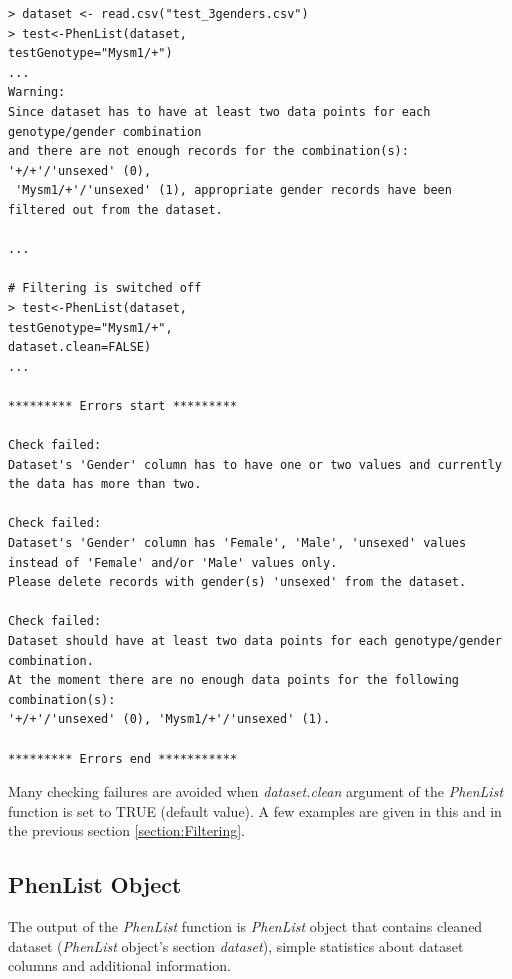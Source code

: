 \documentclass[12pt,a4paper]{article}
\begin{document}
\begingroup
    \fontsize{8pt}{12pt}\selectfont
\begin{verbatim}
> dataset <- read.csv("test_3genders.csv")
> test<-PhenList(dataset,
testGenotype="Mysm1/+")
...
Warning:
Since dataset has to have at least two data points for each genotype/gender combination 
and there are not enough records for the combination(s): '+/+'/'unsexed' (0),
 'Mysm1/+'/'unsexed' (1), appropriate gender records have been filtered out from the dataset.

...

# Filtering is switched off
> test<-PhenList(dataset,
testGenotype="Mysm1/+",
dataset.clean=FALSE)
...

********* Errors start *********

Check failed:
Dataset's 'Gender' column has to have one or two values and currently the data has more than two.

Check failed:
Dataset's 'Gender' column has 'Female', 'Male', 'unsexed' values 
instead of 'Female' and/or 'Male' values only. 
Please delete records with gender(s) 'unsexed' from the dataset.

Check failed:
Dataset should have at least two data points for each genotype/gender combination. 
At the moment there are no enough data points for the following combination(s): 
'+/+'/'unsexed' (0), 'Mysm1/+'/'unsexed' (1).

********* Errors end ***********

\end{verbatim}
\endgroup

Many checking failures are avoided when \textit{dataset.clean} argument of the \textit{PhenList} function is set to TRUE (default value). A few examples are given in this and in the previous section \ref{section:Filtering}.

\subsection{PhenList Object}
The output of the \textit{PhenList} function is \textit{PhenList} object that contains cleaned dataset (\textit{PhenList} object's section \textit{dataset}), simple statistics about dataset columns and additional information. 
\end{document}
